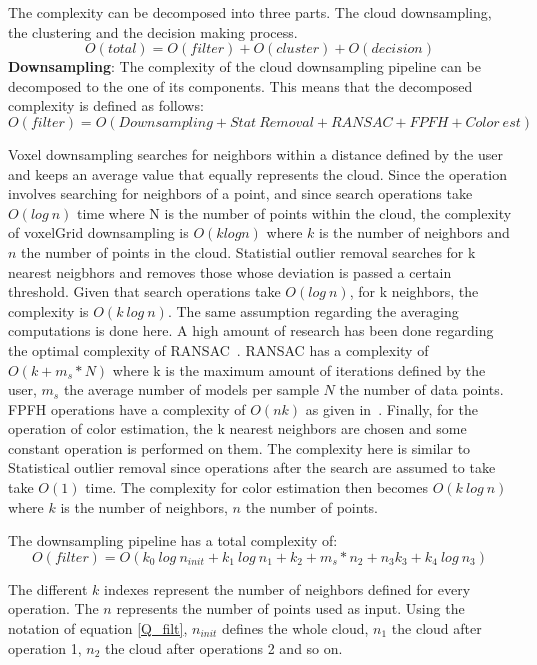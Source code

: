 \documentclass[twoside,hidelinks]{article}
\begin{document}
The complexity can be decomposed into three parts. The cloud downsampling, the clustering and the decision making process.
$$
O(total) = O(filter) + O(cluster) + O(decision)
$$
\textbf{Downsampling}: The complexity of the cloud downsampling pipeline can be decomposed to the one of its components. This means that the decomposed complexity is defined as follows:
$$O(filter) = O(Downsampling + Stat\ Removal + RANSAC+ FPFH + Color\ est) $$

Voxel downsampling searches for neighbors within a distance defined by the user and keeps an average value that equally represents the cloud. Since the operation involves searching for neighbors of a point, and since search operations take $O(log\ n)$ time where N is the number of points within the cloud, the complexity of voxelGrid downsampling is $O(k log n)$ where $k$ is the number of neighbors and $n$ the number of points in the cloud. 
Statistial outlier removal searches for k nearest neigbhors and removes those whose deviation is passed a certain threshold. Given that search operations take $O(log\ n)$, for k neighbors, the complexity is $O(k\ log\ n)$. The same assumption regarding the averaging computations is done here.
A high amount of research has been done regarding the optimal complexity of RANSAC~\cite{RANSAC}. RANSAC has a complexity of $ O(k+ m_s*N)$ where k is the maximum amount of iterations defined by the user, $m_s$ the average number of models per sample $N$ the number of data points.
FPFH operations have a complexity of $O(nk)$ as given in~\cite{fpfh}.
Finally, for the operation of color estimation, the k nearest neighbors are chosen and some constant operation is performed on them. The complexity here is similar to Statistical outlier removal since operations after the search are assumed to take take $O(1)$ time. The complexity for color estimation then becomes $O(k\ log\ n)$ where $k$ is the number of neighbors, $n$ the number of points. 

The downsampling pipeline has a total complexity of:
\begin{equation} \label{Q_filt}
O(filter) = O(k_{0}\ log\ n_{init} + k_{1}\ log\ n_{1} + k_{2}+ m_s*n_{2} + n_{3}k_{3} + k_{4}\ log\ n_{3} )
\end{equation}

The different $k$ indexes represent the number of neighbors defined for every operation. The $n$ represents the number of points used as input. Using the notation of equation \ref{Q_filt}, $n_{init}$ defines the whole cloud, $n_1$ the cloud after operation 1, $n_2$ the cloud after operations 2 and so on.
\end{document}
